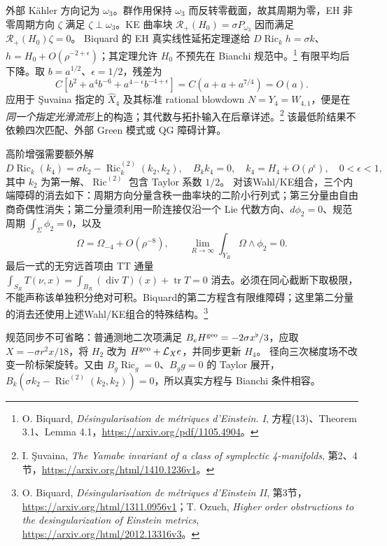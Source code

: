 \documentclass[UTF8,fontset=fandol,zihao=-4,oneside,openany]{ctexbook}
\theoremstyle{cjkplain}
\numberwithin{equation}{chapter}
\DeclareMathOperator{\Ric}{Ric}
\DeclareMathOperator{\tr}{tr}
\begin{document}
外部 Kähler 方向记为 \(\omega_3\)。群作用保持 \(\omega_3\) 而反转零截面，故其周期为零，EH 非零周期方向 \(\zeta\) 满足 \(\zeta\perp\omega_3\)。KE 曲率块
\(\mathcal R_+(H_0)=\sigma P_{\omega_3}\) 因而满足
\(\mathcal R_+(H_0)\zeta=0\)。
Biquard 的 EH 真实线性延拓定理遂给
\(D\Ric_kh=\sigma k\)、
\(h=H_0+O(\rho^{-2+\epsilon})\)；其定理允许 \(H_0\) 不预先在 Bianchi 规范中。\footnote{O. Biquard, \emph{Désingularisation de métriques d'Einstein. I}, 方程(13)、Theorem 3.1、Lemma 4.1，\url{https://arxiv.org/pdf/1105.4904}。}
有限平均后下降。取 \(b=a^{1/2}\)、\(\epsilon=1/2\)，残差为
\[
C\left[b^2+a^4b^{-6}+a^{4-\epsilon}b^{-4+\epsilon}\right]
=C(a+a+a^{7/4})=O(a).
\]
应用于 Şuvaina 指定的 \(\widehat X_4\) 及其标准 rational blowdown
\(N=Y_4=W_{4,1}\)，便是在\emph{同一个指定光滑流形}上的构造；其代数与拓扑输入在后章详述。\footnote{I. Şuvaina, \emph{The Yamabe invariant of a class of symplectic 4-manifolds}, 第2、4节，\url{https://arxiv.org/html/1410.1236v1}。}
该最低阶结果不依赖四次匹配、外部 Green 模式或 QG 障碍计算。

高阶增强需要额外解
\begin{equation}\label{FND:quarticequation}
D\Ric_k(k_4)=\sigma k_2-\Ric_k^{(2)}(k_2,k_2),\quad
B_kk_4=0,\quad k_4=H_4+O(\rho^\epsilon),\quad0<\epsilon<1,
\end{equation}
其中 \(k_2\) 为第一解、\(\Ric^{(2)}\) 包含 Taylor 系数 \(1/2\)。
对该Wahl/KE组合，三个内端障碍的消去如下：周期方向分量含秩一曲率块的二阶小行列式；第三分量由自由商奇偶性消失；第二分量须利用一阶连接仅沿一个 Lie 代数方向、\(d\phi_2=0\)、规范周期 \(\int_\Sigma\phi_2=0\)，以及
\[
\Omega=\Omega_{-4}+O(\rho^{-8}),\qquad
\lim_{R\to\infty}\int_{Y_R}\Omega\wedge\phi_2=0 .
\]
最后一式的无穷远首项由 TT 通量
\(\int_{S_R}T(\nu,x)=\int_{B_R}(\operatorname{div}T)(x)+\tr T=0\)
消去。必须在同心截断下取极限，不能声称该单独积分绝对可积。Biquard的第二方程含有限维障碍；这里第二分量的消去还使用上述Wahl/KE组合的特殊结构。\footnote{O. Biquard, \emph{Désingularisation de métriques d'Einstein II}, 第3节，\url{https://arxiv.org/html/1311.0956v1}；T. Ozuch, \emph{Higher order obstructions to the desingularization of Einstein metrics}, \url{https://arxiv.org/html/2012.13316v3}。}

规范同步不可省略：普通测地二次项满足
\(B_eH^{\rm geo}=-2\sigma x^\flat/3\)，应取
\(X=-\sigma r^2x/18\)，将 \(H_2\) 改为
\(H^{\rm geo}+\mathcal L_Xe\)，并同步更新 \(H_4\)。
径向三次梯度场不改变一阶标架旋转。又由
\(B_g\Ric_g=0\)、\(B_gg=0\) 的 Taylor 展开，
\(B_k(\sigma k_2-\Ric^{(2)}(k_2,k_2))=0\)，所以真实方程与 Bianchi 条件相容。
\end{document}
